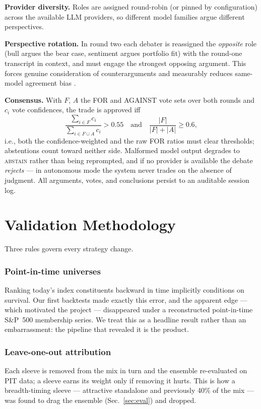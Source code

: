 \documentclass[10pt,twocolumn]{IEEEtran}
\begin{document}
\textbf{Provider diversity.} Roles are assigned round-robin (or pinned by
configuration) across the available LLM providers, so different model
families argue different perspectives.

\textbf{Perspective rotation.} In round two each debater is reassigned the
\emph{opposite} role (bull argues the bear case, sentiment argues portfolio
fit) with the round-one transcript in context, and must engage the strongest
opposing argument. This forces genuine consideration of counterarguments
and measurably reduces same-model agreement bias \cite{du2023improving}.

\textbf{Consensus.} With $F$, $A$ the FOR and AGAINST vote sets over both
rounds and $c_i$ vote confidences, the trade is approved iff
\begin{equation}
\frac{\sum_{i \in F} c_i}{\sum_{i \in F \cup A} c_i} > 0.55
\quad \text{and} \quad
\frac{|F|}{|F| + |A|} \geq 0.6,
\end{equation}
i.e., both the confidence-weighted and the raw FOR ratios must clear
thresholds; abstentions count toward neither side. Malformed model output
degrades to \textsc{abstain} rather than being reprompted, and if no
provider is available the debate \emph{rejects} --- in autonomous mode the
system never trades on the absence of judgment. All arguments, votes, and
conclusions persist to an auditable session log.

\section{Validation Methodology}
\label{sec:method}

Three rules govern every strategy change.

\subsubsection{Point-in-time universes} Ranking today's index constituents
backward in time implicitly conditions on survival. Our first backtests made
exactly this error, and the apparent edge --- which motivated the project ---
disappeared under a reconstructed point-in-time S\&P~500 membership series.
We treat this as a headline result rather than an embarrassment: the
pipeline that revealed it is the product.

\subsubsection{Leave-one-out attribution} Each sleeve is removed from the
mix in turn and the ensemble re-evaluated on PIT data; a sleeve earns its
weight only if removing it hurts. This is how a breadth-timing sleeve ---
attractive standalone and previously 40\% of the mix --- was found to drag
the ensemble (Sec.~\ref{sec:eval}) and dropped.
\end{document}
